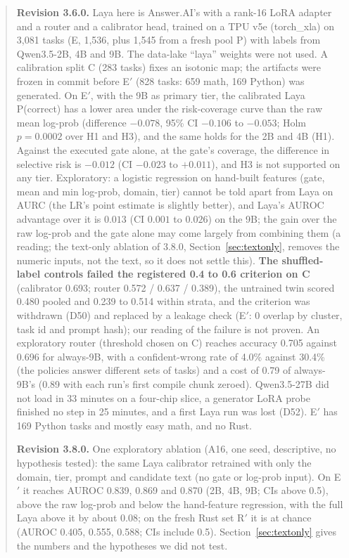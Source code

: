 \documentclass[11pt,a4paper]{article}
\newcommand{\code}[1]{\texttt{\detokenize{#1}}}
\begin{document}
\begin{abstract}
\textbf{Revision 3.6.0.} Laya here is Answer.AI's \code{ModernBERT-large} with a rank-16 LoRA adapter and a router and a calibrator head,
trained on a TPU v5e (torch\_xla) on 3,081 tasks (E, 1,536, plus 1,545 from a fresh pool P) with labels from Qwen3.5-2B, 4B and 9B. The data-lake
``laya'' weights were not used. A calibration split C (283 tasks) fixes an isotonic map; the artifacts were frozen in commit
\code{d217f1e} before E$'$ (828 tasks: 659 math, 169 Python) was generated. On E$'$, with the 9B as primary tier, the calibrated Laya
P(correct) has a lower area under the risk-coverage curve than the raw mean log-prob (difference $-0.078$, 95\% CI $-0.106$ to $-0.053$; Holm $p=0.0002$ over H1 and H3), and the same holds for the 2B and 4B (H1). Against the executed gate alone, at
the gate's coverage, the difference in selective risk is $-0.012$ (CI $-0.023$ to $+0.011$), and H3 is not supported on any tier. Exploratory:
a logistic regression on hand-built features (gate, mean and min log-prob, domain, tier) cannot be told apart from Laya on AURC (the LR's point estimate is slightly better), and
Laya's AUROC advantage over it is $0.013$ (CI $0.001$ to $0.026$) on the 9B; the gain over the raw log-prob and the gate alone may come largely from combining them (a reading; the text-only ablation of 3.8.0, Section~\ref{sec:textonly}, removes the numeric inputs, not the text, so it does not settle this).
\textbf{The shuffled-label controls failed the registered 0.4 to 0.6 criterion on C} (calibrator 0.693; router 0.572 / 0.637 / 0.389), the untrained twin scored 0.480 pooled and 0.239 to 0.514 within strata, and the criterion was withdrawn (D50) and replaced by a leakage check (E$'$: 0 overlap by cluster, task id and prompt hash); our reading of the failure is not proven.
An exploratory router (threshold chosen on C) reaches accuracy 0.705 against 0.696 for always-9B, with a confident-wrong rate of 4.0\% against 30.4\% (the policies answer different sets of tasks) and a cost of
0.79 of always-9B's (0.89 with each run's first compile chunk zeroed). Qwen3.5-27B did not load in 33 minutes on a four-chip slice, a generator LoRA probe finished no step in 25 minutes, and a first Laya run was lost (D52).
E$'$ has 169 Python tasks and mostly easy math, and no Rust.

\textbf{Revision 3.8.0.} One exploratory ablation (A16, one seed, descriptive, no hypothesis tested): the same Laya calibrator retrained with only the domain, tier, prompt and candidate text (no gate or log-prob input). On E$'$ it reaches AUROC 0.839, 0.869 and 0.870 (2B, 4B, 9B; CIs above 0.5), above the raw log-prob and below the hand-feature regression, with the full Laya above it by about 0.08; on the fresh Rust set R$'$ it is at chance (AUROC 0.405, 0.555, 0.588; CIs include 0.5). Section~\ref{sec:textonly} gives the numbers and the hypotheses we did not test.


\end{abstract}
\end{document}
